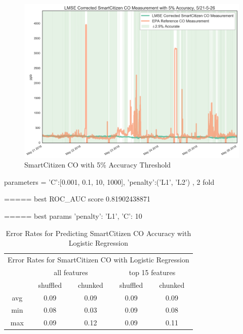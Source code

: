 \begin{figure}[htb]
 	\includegraphics[width=\textwidth]{figs/sck_co_with_5_accuracy_zoomed}               
 	 \caption{SmartCitizen CO with 5\% Accuracy Threshold}
  	\label{fig:sck_co_with_5_accuracy_zoomed}
\end{figure}




parameters = {'C':[0.001, 0.1, 10, 1000], 'penalty':('L1', 'L2') }, 2 fold

===== best ROC\_AUC score 0.81902438871

===== best params {'penalty': 'L1', 'C': 10}



\begin{table}[H]
\centering
\begin{tabular}{|c|c|c|c|c|}
\toprule
\multicolumn{5}{|c|}{Error Rates for SmartCitizen CO with Logistic Regression} \\
&\multicolumn{2}{|c|}{all features} & \multicolumn{2}{|c|}{top 15 features} \\
&shuffled & chunked & shuffled & chunked \\
avg & 0.09 & 0.09 & 0.09 & 0.09 \\
min & 0.08 & 0.03 & 0.09 & 0.08 \\
max & 0.09 & 0.12 & 0.09 & 0.11 \\
\bottomrule
\end{tabular}
\label{tab:sck_co_error_rates}
\caption{Error Rates for Predicting SmartCitizen CO Accuracy with Logistic Regression}
\end{table}




